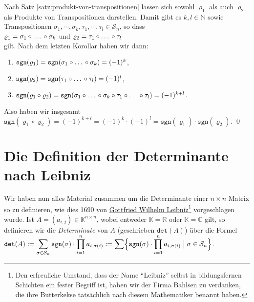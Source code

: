\proof
Nach Satz \ref{satz:produkt-von-transpositionen} lassen sich sowohl $\varrho_1$ als auch $\varrho_2$ als
Produkte von Transpositionen darstellen.  Damit gibt es $k,l \in \mathbb{N}$ sowie
Transpositionen $\sigma_1, \cdots, \sigma_{k}, \tau_1, \cdots, \tau_l \in \mathcal{S}_n$, so dass
\\[0.2cm]
\hspace*{1.3cm}
$\varrho_1 = \sigma_1 \circ \mbox{\dots} \circ \sigma_{k}$ \quad und \quad
 $\varrho_2 = \tau_1 \circ \mbox{\dots} \circ \tau_l$
\\[0.2cm]
gilt.   Nach dem letzten Korollar haben wir dann: 
\begin{enumerate}
\item $\mathtt{sgn}(\varrho_1) = \mathtt{sgn}(\sigma_1 \circ \mbox{\dots} \circ \sigma_{k}) = (-1)^k$, 
\item $\mathtt{sgn}(\varrho_2) = \mathtt{sgn}(\tau_1 \circ \mbox{\dots} \circ \tau_l) = (-1)^l$,
\item $\mathtt{sgn}(\varrho_1 \circ \varrho_2) = 
       \mathtt{sgn}(\sigma_1 \circ \mbox{\dots} \circ \sigma_{k} \circ \tau_1 \circ \mbox{\dots} \circ \tau_l) = (-1)^{k+l}$.
\end{enumerate}
Also haben wir insgesamt
\\[0.2cm]
\hspace*{1.3cm}
$\mathtt{sgn}(\varrho_1 \circ \varrho_2) = (-1)^{k+l} = (-1)^k \cdot (-1)^l = \mathtt{sgn}(\varrho_1) \cdot \mathtt{sgn}(\varrho_2)$.  
\qed

\section{Die Definition der Determinante nach Leibniz}
Wir haben nun alles Material zusammen um die Determinante einer $n \times n$ Matrix so zu
definieren, wie dies 1690 von
\href{http://de.wikipedia.org/wiki/Gottfried_Wilhelm_Leibniz}{Gottfried Wilhelm Leibniz\footnote{
  Den erfreuliche Umstand, dass der Name ``Leibniz'' selbst in bildungsfernen Schichten ein fester
  Begriff ist, haben wir   der Firma \href{http://www.bahlsen.com}{Bahlsen} zu verdanken, die ihre
  \href{http://en.wikipedia.org/wiki/Leibniz-Keks}{Butterkekse} tats\"achlich nach diesem Mathematiker
  benannt haben.
}} 
vorgeschlagen wurde.  Ist $A = (a_{i,j}) \in \mathbb{K}^{n \times n}$, wobei entweder 
$\mathbb{K}= \mathbb{R}$ oder $\mathbb{K}= \mathbb{C}$ gilt, so definieren wir die
\emph{Determinate} von $A$ (geschrieben $\mathtt{det}(A)$) \"uber die Formel
\\[0.2cm]
\hspace*{1.3cm}
$\displaystyle\mathtt{det}(A) :=  \sum\limits_{\sigma \in \mathcal{S}_n} \mathtt{sgn}(\sigma) \cdot \prod\limits_{i=1}^n a_{i,\sigma(i)} 
  := \sum \Bigl\{ \mathtt{sgn}(\sigma) \cdot  \prod\limits_{i=1}^n a_{i,\sigma(i)} \bigm| \sigma \in \mathcal{S}_n \Bigr\}
$.

